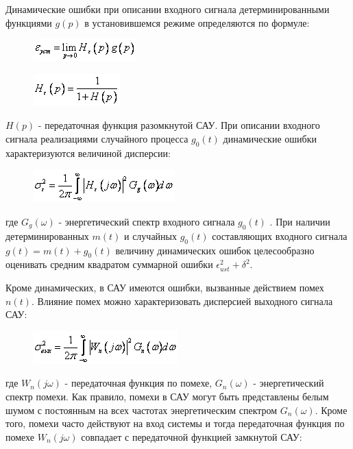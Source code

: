 \documentclass[14pt,a4paper,report]{report}
\begin{document}
Динамические ошибки при описании входного сигнала детерминированными функциями $g(p)$ в установившемся режиме определяются по формуле: 

\begin{figure}[h!]
	\centering
	\includegraphics[scale = 0.90]{images/13.png}
	\label{image:13}
\end{figure}

\begin{figure}[h!]
	\centering
	\includegraphics[scale = 0.90]{images/14.png}
	\label{image:14}
\end{figure}

$H(p)$ - передаточная функция разомкнутой САУ. При описании входного сигнала реализациями случайного процесса $g_0(t)$ динамические ошибки характеризуются величиной дисперсии:

\begin{figure}[h!]
	\centering
	\includegraphics[scale = 0.90]{images/15.png}
	\label{image:15}
\end{figure}

где $G_g(\omega)$ - энергетический спектр входного сигнала $g_0(t)$ . При наличии детерминированных $m(t)$ и случайных $g_0(t)$ составляющих входного сигнала $g(t)=m(t)+g_0(t)$ величину динамических ошибок целесообразно оценивать средним квадратом суммарной ошибки $\epsilon_{ust}^2+\delta^2$.  

Кроме динамических, в САУ имеются ошибки, вызванные действием помех $n(t)$. Влияние помех можно характеризовать дисперсией выходного сигнала САУ:

\begin{figure}[h!]
	\centering
	\includegraphics[scale = 0.90]{images/16.png}
	\label{image:16}
\end{figure}

где $W_n(j\omega)$ - передаточная функция по помехе, $G_n(\omega)$ - энергетический спектр помехи. Как правило, помехи в САУ могут быть представлены белым шумом с постоянным на всех частотах энергетическим спектром $G_n(\omega)$. Кроме того, помехи часто действуют на вход системы и тогда передаточная функция по помехе $W_n(j\omega)$ совпадает с передаточной функцией замкнутой САУ:
\end{document}
